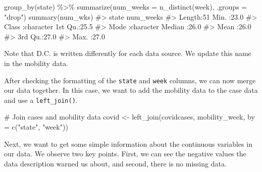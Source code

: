 \documentclass[
  letterpaper,
]{latex/krantz}
\makeatletter
\newenvironment{Shaded}{\begin{snugshade}}{\end{snugshade}}
\newcommand{\AttributeTok}[1]{\textcolor[rgb]{0.40,0.45,0.13}{#1}}
\newcommand{\CommentTok}[1]{\textcolor[rgb]{0.37,0.37,0.37}{#1}}
\newcommand{\FunctionTok}[1]{\textcolor[rgb]{0.28,0.35,0.67}{#1}}
\newcommand{\NormalTok}[1]{\textcolor[rgb]{0.00,0.23,0.31}{#1}}
\newcommand{\OtherTok}[1]{\textcolor[rgb]{0.00,0.23,0.31}{#1}}
\newcommand{\SpecialCharTok}[1]{\textcolor[rgb]{0.37,0.37,0.37}{#1}}
\newcommand{\StringTok}[1]{\textcolor[rgb]{0.13,0.47,0.30}{#1}}
\newenvironment{kframe}{%
\medskip{}
\setlength{\fboxsep}{.8em}
 \def\at@end@of@kframe{}%
 \ifinner\ifhmode%
  \def\at@end@of@kframe{\end{minipage}}%
  \begin{minipage}{\columnwidth}%
 \fi\fi%
 \def\FrameCommand##1{\hskip\@totalleftmargin \hskip-\fboxsep
 \colorbox{shadecolor}{##1}\hskip-\fboxsep
     \hskip-\linewidth \hskip-\@totalleftmargin \hskip\columnwidth}%
 \MakeFramed {\advance\hsize-\width
   \@totalleftmargin\z@ \linewidth\hsize
   \@setminipage}}%
 {\par\unskip\endMakeFramed%
 \at@end@of@kframe}
\renewenvironment{Shaded}{\begin{kframe}}{\end{kframe}}
\makeatother
\begin{document}
\begin{Shaded}
\begin{Highlighting}[]
  \FunctionTok{group\_by}\NormalTok{(state) }\SpecialCharTok{\%\textgreater{}\%}
  \FunctionTok{summarize}\NormalTok{(}\AttributeTok{num\_weeks =} \FunctionTok{n\_distinct}\NormalTok{(week), }\AttributeTok{.groups =} \StringTok{"drop"}\NormalTok{)}
\FunctionTok{summary}\NormalTok{(num\_wks)}
\CommentTok{\#\textgreater{}     state             num\_weeks   }
\CommentTok{\#\textgreater{}  Length:51          Min.   :23.0  }
\CommentTok{\#\textgreater{}  Class :character   1st Qu.:25.5  }
\CommentTok{\#\textgreater{}  Mode  :character   Median :26.0  }
\CommentTok{\#\textgreater{}                     Mean   :26.0  }
\CommentTok{\#\textgreater{}                     3rd Qu.:27.0  }
\CommentTok{\#\textgreater{}                     Max.   :27.0}
\end{Highlighting}
\end{Shaded}

Note that D.C. is written differently for each data source. We update
this name in the mobility data.

\begin{Shaded}
\end{Shaded}

After checking the formatting of the \texttt{state} and \texttt{week}
columns, we can now merge our data together. In this case, we want to
add the mobility data to the case data and use a \texttt{left\_join()}.

\begin{Shaded}
\begin{Highlighting}[]
\CommentTok{\# Join cases and mobility data}
\NormalTok{covid }\OtherTok{\textless{}{-}} \FunctionTok{left\_join}\NormalTok{(covidcases, mobility\_week, }\AttributeTok{by =} \FunctionTok{c}\NormalTok{(}\StringTok{"state"}\NormalTok{, }\StringTok{"week"}\NormalTok{))}
\end{Highlighting}
\end{Shaded}

Next, we want to get some simple information about the continuous
variables in our data. We observe two key points. First, we can see the
negative values the data description warned us about, and second, there
is no missing data.
\end{document}
